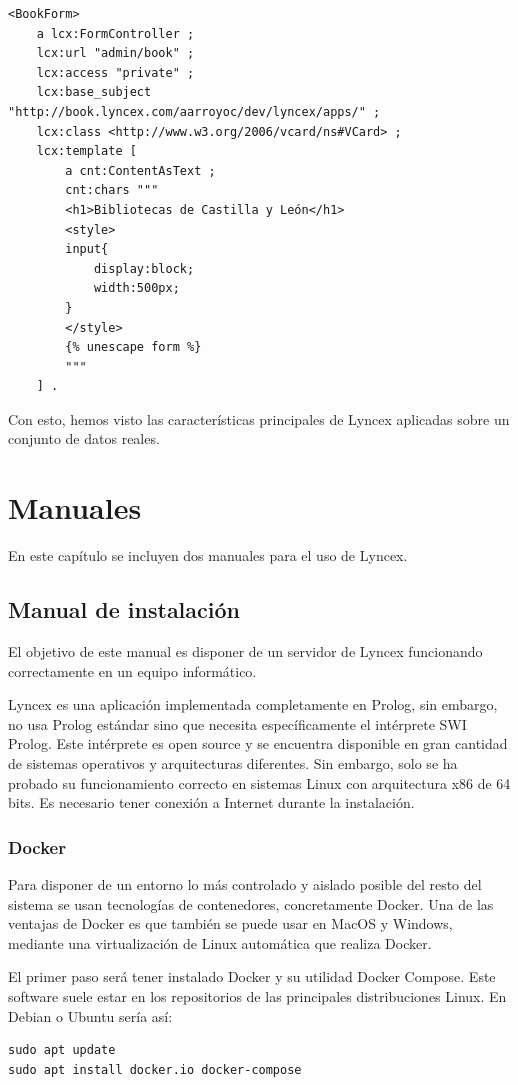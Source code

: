 \documentclass[12pt]{report} %
\begin{document}
\begin{lstlisting}
<BookForm>
    a lcx:FormController ;
    lcx:url "admin/book" ;
    lcx:access "private" ;
    lcx:base_subject "http://book.lyncex.com/aarroyoc/dev/lyncex/apps/" ;
    lcx:class <http://www.w3.org/2006/vcard/ns#VCard> ;
    lcx:template [
        a cnt:ContentAsText ;
        cnt:chars """
        <h1>Bibliotecas de Castilla y León</h1>
        <style>
        input{
            display:block;
            width:500px;
        }
        </style>
        {% unescape form %}
        """
    ] .
\end{lstlisting}

Con esto, hemos visto las características principales de Lyncex aplicadas sobre un conjunto de datos reales.


\chapter{Manuales}

En este capítulo se incluyen dos manuales para el uso de Lyncex.

\section{Manual de instalación}

El objetivo de este manual es disponer de un servidor de Lyncex funcionando correctamente en un equipo informático.

Lyncex es una aplicación implementada completamente en Prolog, sin embargo, no usa Prolog estándar sino que necesita específicamente el intérprete SWI Prolog. Este intérprete es open source y se encuentra disponible en gran cantidad de sistemas operativos y arquitecturas diferentes. Sin embargo, solo se ha probado su funcionamiento correcto en sistemas Linux con arquitectura x86 de 64 bits. Es necesario tener conexión a Internet durante la instalación.

\subsection{Docker}

Para disponer de un entorno lo más controlado y aislado posible del resto del sistema se usan tecnologías de contenedores, concretamente Docker. Una de las ventajas de Docker es que también se puede usar en MacOS y Windows, mediante una virtualización de Linux automática que realiza Docker.

El primer paso será tener instalado Docker y su utilidad Docker Compose. Este software suele estar en los repositorios de las principales distribuciones Linux. En Debian o Ubuntu sería así:
\begin{verbatim}
sudo apt update
sudo apt install docker.io docker-compose
\end{verbatim}
\end{document}

